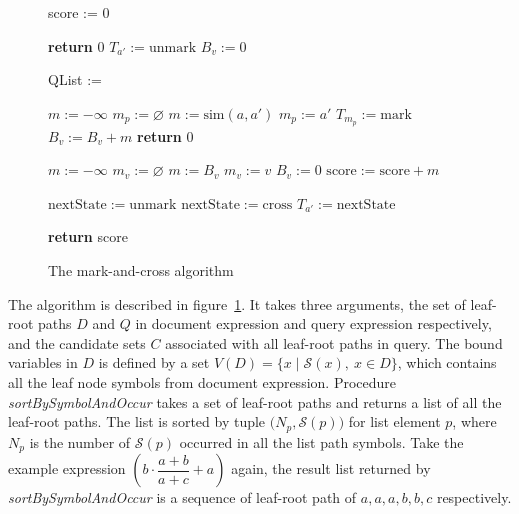 \begin{figure}
\begin{algorithmic}[1]

\State score := 0

\State \textbf{return} 0 
\EndIf
{}
\State $T_{a'} := \mathrm{unmark}$ 
\EndFor
{}
\State $B_v := 0$ 
\EndFor

\State QList := 


\State $m := -\infty$
\State $m_p := \varnothing$
\State $m := \mathrm{sim}(a, a')$ 
\State $m_p := a'$ 
\EndIf
\EndFor
{}
\State $T_{m_p} := \mathrm{mark}$ 
\State $B_v := B_v + m$
\Else
{}
\State \textbf{return} 0 
\EndIf
\EndFor

\label{line_bond_finish}

\State $m := -\infty$
\State $m_v := \varnothing $
\State $m := B_v$ 
\State $m_v := v$ 
\EndIf
\State $B_v := 0$ 
\EndFor
\State $\mathrm{score} := \mathrm{score} + m$ 

\State $\mathrm{nextState} := \mathrm{unmark}$ 
\Else
\State $\mathrm{nextState} := \mathrm{cross}$ 
\EndIf
{}
\State $T_{a'} := \mathrm{nextState}$ 
\EndIf
\EndFor
\EndFor

\EndIf

\EndFor

\State \textbf{return} score
\EndProcedure

\end{algorithmic}
\caption{The mark-and-cross algorithm}\label{markcrossalgo}
\end{figure}

The algorithm is described in figure~\ref{markcrossalgo}. It takes three arguments, the set of leaf-root paths $D$ and $Q$ in document expression and query expression respectively, and the candidate sets $C$ associated with all leaf-root paths in query. 
The bound variables in $D$ is defined by a set $V(D) = \{x \mid \mathcal{S}(x),\ x \in D\}$, which contains all the leaf node symbols from document expression.
Procedure \textit{sortBySymbolAndOccur} takes a set of leaf-root paths and returns a list of all the leaf-root paths. 
The list is sorted by tuple $\big(N_p, \mathcal{S}(p)\big)$ for list element $p$, where $N_p$ is the number of $\mathcal{S}(p)$ occurred in all the list path symbols. 
Take the example expression $\left(b \cdot \dfrac{a+b}{a+c} + a\right)$ again, the result list returned by \textit{sortBySymbolAndOccur} is a sequence of leaf-root path of $a,a,a,b,b,c$ respectively.


